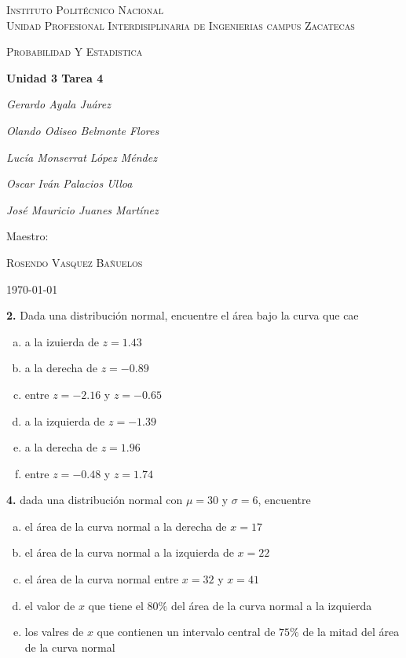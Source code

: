 \documentclass[12pt, letterpaper]{article}
\begin{document}
    \begin{titlepage}
        \centering
        {\scshape\LARGE Instituto Politécnico Nacional\\ Unidad Profesional Interdisiplinaria de Ingenierias campus Zacatecas\par}
        \vspace{1cm}
        {\scshape\Large Probabilidad Y Estadistica\par}
        \vspace{1.5cm}
        {\huge\bfseries Unidad 3 Tarea 4\par}
        \vspace{2cm}
        {\Large\itshape Gerardo Ayala Juárez\par}
        {\Large\itshape Olando Odiseo Belmonte Flores\par}
        {\Large\itshape Lucía Monserrat López Méndez\par}
        {\Large\itshape Oscar Iván Palacios Ulloa\par}
        {\Large\itshape José Mauricio Juanes Martínez\par}
        \vfill
        Maestro:\par
        \textsc{
        Rosendo Vasquez Bañuelos}
        \vfill
        {\large \today \par}
    \end{titlepage}

    \textbf{2. }Dada una distribución normal, encuentre el área bajo la curva  que cae
        \begin{enumerate}[a)]
            \item a la izuierda de $z=1.43$
            \item a la derecha de $z=-0.89$
            \item entre $z=-2.16$ y $z=-0.65$
            \item a la izquierda de $z=-1.39$
            \item a la derecha de $z=1.96$
            \item entre $z=-0.48$ y $z=1.74$
        \end{enumerate} \vskip1cm

    \textbf{4. } dada una distribución normal con $\mu = 30$ y $\sigma = 6$, encuentre
        \begin{enumerate}[a)]
            \item el área de la curva normal a la derecha de $x=17$
            \item el área de la curva normal a la izquierda de $x=22$
            \item el área de la curva normal entre $x=32$ y $x=41$
            \item el valor de $x$ que tiene el $80\%$ del área de la curva normal a la izquierda
            \item los valres de $x$ que contienen un intervalo central de $75\%$ de la mitad del área de la curva normal
        \end{enumerate}\vskip1cm
\end{document}
